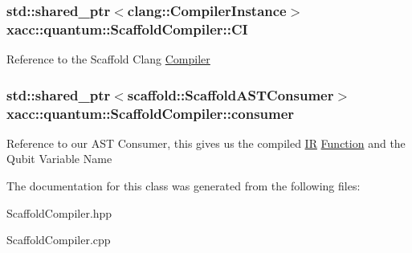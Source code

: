 \subsubsection[{\texorpdfstring{CI}{CI}}]{\setlength{\rightskip}{0pt plus 5cm}std\+::shared\+\_\+ptr$<$clang\+::\+Compiler\+Instance$>$ xacc\+::quantum\+::\+Scaffold\+Compiler\+::\+CI\hspace{0.3cm}{\ttfamily [protected]}}\hypertarget{a00260_af7a3a73eaab025a0ea72cc9335d8fbb4}{}\label{a00260_af7a3a73eaab025a0ea72cc9335d8fbb4}
Reference to the Scaffold Clang \hyperlink{a00059}{Compiler} 
\subsubsection[{\texorpdfstring{consumer}{consumer}}]{\setlength{\rightskip}{0pt plus 5cm}std\+::shared\+\_\+ptr$<${\bf scaffold\+::\+Scaffold\+A\+S\+T\+Consumer}$>$ xacc\+::quantum\+::\+Scaffold\+Compiler\+::consumer\hspace{0.3cm}{\ttfamily [protected]}}\hypertarget{a00260_a74f86a2074ec8bd5eeea3ad992433091}{}\label{a00260_a74f86a2074ec8bd5eeea3ad992433091}
Reference to our A\+ST Consumer, this gives us the compiled \hyperlink{a00167}{IR} \hyperlink{a00106}{Function} and the Qubit Variable Name 

The documentation for this class was generated from the following files\+:\begin{DoxyCompactItemize}
\item 
Scaffold\+Compiler.\+hpp\item 
Scaffold\+Compiler.\+cpp\end{DoxyCompactItemize}
